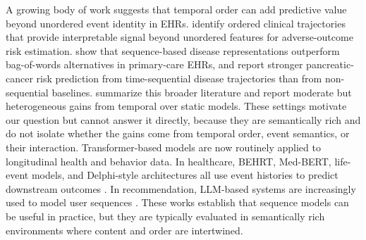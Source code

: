 \documentclass{article}
\theoremstyle{plain}
\theoremstyle{definition}
\theoremstyle{remark}
\begin{document}
A growing body of work suggests that temporal order can add predictive value beyond unordered event identity in EHRs. \citet{edelman2026order_specific_ehr} identify ordered clinical trajectories that provide interpretable signal beyond unordered features for adverse-outcome risk estimation. \citet{beaney2024coded_disease_representations} show that sequence-based disease representations outperform bag-of-words alternatives in primary-care EHRs, and \citet{placido2023pancreatic_trajectories} report stronger pancreatic-cancer risk prediction from time-sequential disease trajectories than from non-sequential baselines. \citet{pollington2026trajectory_review} summarize this broader literature and report moderate but heterogeneous gains from temporal over static models. These settings motivate our question but cannot answer it directly, because they are semantically rich and do not isolate whether the gains come from temporal order, event semantics, or their interaction. Transformer-based models are now routinely applied to longitudinal health and behavior data. In healthcare, BEHRT, Med-BERT, life-event models, and Delphi-style architectures all use event histories to predict downstream outcomes \citep{li2020behrt,rasmy2021medbert,savcisens2024using,delphi2025transformer}. In recommendation, LLM-based systems are increasingly used to model user sequences \citep{kimLostSequenceLarge2025b}. These works establish that sequence models can be useful in practice, but they are typically evaluated in semantically rich environments where content and order are intertwined.
\end{document}
